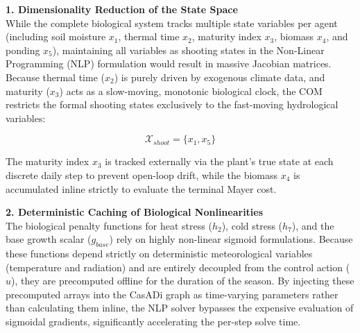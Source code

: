 \documentclass[11pt, a4paper]{article}
\begin{document}
\textbf{1. Dimensionality Reduction of the State Space} \\
While the complete biological system tracks multiple state variables per agent (including soil moisture $x_1$, thermal time $x_2$, maturity index $x_3$, biomass $x_4$, and ponding $x_5$), maintaining all variables as shooting states in the Non-Linear Programming (NLP) formulation would result in massive Jacobian matrices. Because thermal time ($x_2$) is purely driven by exogenous climate data, and maturity ($x_3$) acts as a slow-moving, monotonic biological clock, the COM restricts the formal shooting states exclusively to the fast-moving hydrological variables:

\begin{equation}
    \mathcal{X}_{shoot} = \{x_1, x_5\}
\end{equation}

The maturity index $x_3$ is tracked externally via the plant's true state at each discrete daily step to prevent open-loop drift, while the biomass $x_4$ is accumulated inline strictly to evaluate the terminal Mayer cost.

\textbf{2. Deterministic Caching of Biological Nonlinearities} \\
The biological penalty functions for heat stress ($h_2$), cold stress ($h_7$), and the base growth scalar ($g_{base}$) rely on highly non-linear sigmoid formulations. Because these functions depend strictly on deterministic meteorological variables (temperature and radiation) and are entirely decoupled from the control action ($u$), they are precomputed offline for the duration of the season. By injecting these precomputed arrays into the CasADi graph as time-varying parameters rather than calculating them inline, the NLP solver bypasses the expensive evaluation of sigmoidal gradients, significantly accelerating the per-step solve time.
\end{document}
